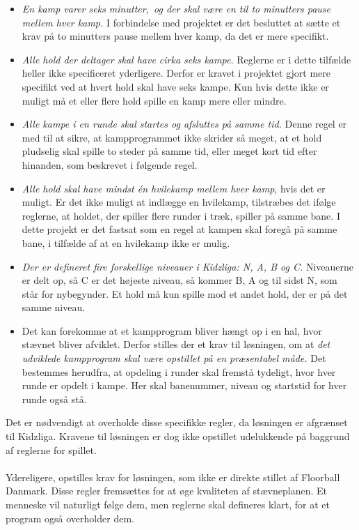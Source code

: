 \begin{itemize}
    \item \textit{En kamp varer seks minutter,\ og der skal være en til to minutters pause mellem hver kamp.} I forbindelse med projektet er det besluttet at sætte et krav på to minutters pause mellem hver kamp, da det er mere specifikt.
    \item \textit{Alle hold der deltager skal have cirka seks kampe.} Reglerne er i dette tilfælde heller ikke specificeret yderligere. Derfor er kravet i projektet gjort mere specifikt ved at hvert hold skal have seks kampe. Kun hvis dette ikke er muligt må et eller flere hold spille en kamp mere eller mindre. 
    \item \textit{Alle kampe i en runde skal startes og afsluttes på samme tid.} Denne regel er med til at sikre, at kampprogrammet ikke skrider så meget, at et hold pludselig skal spille to steder på samme tid, eller meget kort tid efter hinanden, som beskrevet i følgende regel.
    \item \textit{Alle hold skal have mindst én hvilekamp mellem hver kamp}, hvis det er muligt. Er det ikke muligt at indlægge en hvilekamp, tilstræbes det ifølge reglerne, at holdet, der spiller flere runder i træk, spiller på samme bane. I dette projekt er det fastsat som en regel at kampen skal foregå på samme bane, i tilfælde af at en hvilekamp ikke er mulig. 
    \item \textit{Der er defineret fire forskellige niveauer i Kidzliga: N, A, B og C.} Niveauerne er delt op, så C er det højeste niveau, så kommer B, A og til sidst N, som står for nybegynder. Et hold må kun spille mod et andet hold, der er på det samme niveau.
    \item Det kan forekomme at et kampprogram bliver hængt op i en hal, hvor stævnet bliver afviklet. Derfor stilles der et krav til løsningen, om at \textit{det udviklede kampprogram skal være opstillet på en præsentabel måde.} Det bestemmes herudfra, at opdeling i runder skal fremstå tydeligt, hvor hver runde er opdelt i kampe. Her skal banenummer, niveau og startstid for hver runde også stå.
\end{itemize} 
Det er nødvendigt at overholde disse specifikke regler, da løsningen er afgrænset til Kidzliga. Kravene til løsningen er dog ikke opstillet udelukkende på baggrund af reglerne for spillet.
\\\\
Ydereligere, opstilles krav for løsningen, som ikke er direkte stillet af Floorball Danmark. Disse regler fremsættes for at øge kvaliteten af stævneplanen. Et menneske vil naturligt følge dem, men reglerne skal defineres klart, for at et program også overholder dem.

